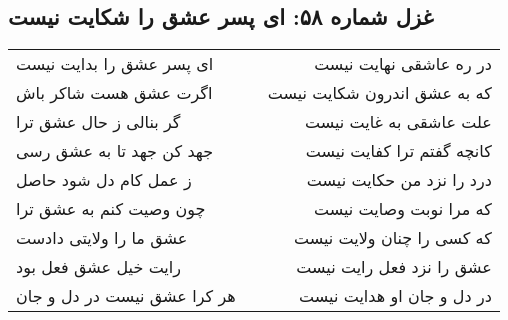 \begin{center}
\section*{غزل شماره ۵۸: ای پسر عشق را شکایت نیست}
\label{sec:058}
\begin{longtable}{l p{0.5cm} r}
ای پسر عشق را بدایت نیست
&&
در ره عاشقی نهایت نیست
\\
اگرت عشق هست شاکر باش
&&
که به عشق اندرون شکایت نیست
\\
گر بنالی ز حال عشق ترا
&&
علت عاشقی به غایت نیست
\\
جهد کن جهد تا به عشق رسی
&&
کانچه گفتم ترا کفایت نیست
\\
ز عمل کام دل شود حاصل
&&
درد را نزد من حکایت نیست
\\
چون وصیت کنم به عشق ترا
&&
که مرا نوبت وصایت نیست
\\
عشق ما را ولایتی دادست
&&
که کسی را چنان ولایت نیست
\\
رایت خیل عشق فعل بود
&&
عشق را نزد فعل رایت نیست
\\
هر کرا عشق نیست در دل و جان
&&
در دل و جان او هدایت نیست
\\
\end{longtable}
\end{center}
